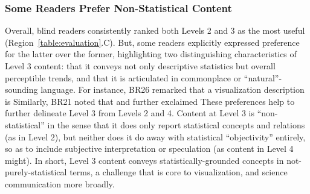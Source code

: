 
\subsubsection{Some Readers Prefer Non-Statistical Content}
\label{section:qualResultsC}
Overall, blind readers consistently ranked both Levels 2 and 3 as the most useful (Region~\ref{table:evaluation}.C). But, some readers explicitly expressed preference for the latter over the former, highlighting two distinguishing characteristics of Level 3 content: that it conveys not only descriptive statistics but overall perceptible trends, and that it is articulated in commonplace or ``natural''-sounding language.
For instance, BR26 remarked that a visualization description is 
Similarly, BR21 noted that  and further exclaimed 
These preferences help to further delineate Level 3 from Levels 2 and 4.
Content at Level 3 is ``non-statistical'' in the sense that it does only report statistical concepts and relations (as in Level 2), but neither does it do away with statistical ``objectivity'' entirely, so as to include subjective interpretation or speculation (as content in Level 4 might).
In short, Level 3 content conveys statistically-grounded concepts in not-purely-statistical terms, a challenge that is core to visualization, and science communication more broadly.

